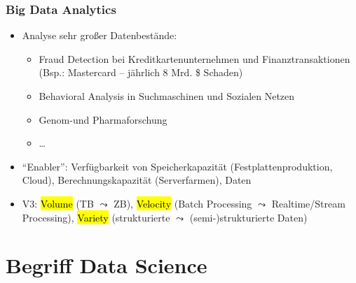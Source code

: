 \begin{frame}
\frametitle{Big Data Analytics}

\begin{itemize}
\item Analyse sehr großer Datenbestände:
\begin{itemize}
\item Fraud Detection bei Kreditkartenunternehmen und
  Finanztransaktionen (Bsp.: Mastercard -- jährlich 8 Mrd. \$ Schaden)
\item  Behavioral Analysis in Suchmaschinen und Sozialen Netzen
\item Genom-und Pharmaforschung
\item \dots
\end{itemize}
\item "`Enabler"': Verfügbarkeit von Speicherkapazität
  (Festplattenproduktion, Cloud), Berechnungskapazität (Serverfarmen), Daten
\item V3: \hl{Volume} (TB $\leadsto$ ZB), \hl{Velocity} (Batch Processing
  $\leadsto$ Realtime/Stream Processing), \hl{Variety} (strukturierte
  $\leadsto$ (semi-)strukturierte Daten)
\end{itemize}

\end{frame}


%
%


\section{Begriff Data Science}


